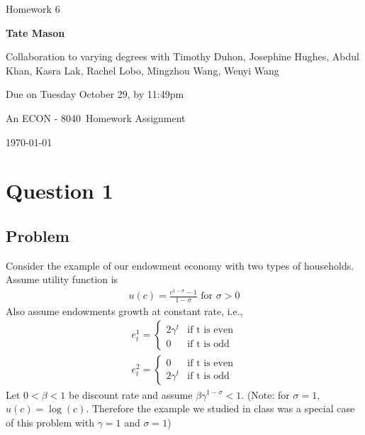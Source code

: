 \documentclass[10pt, a4paper]{article}
\newcommand\course{ECON - 8040}
\newcommand\hwnumber{6}
\newcommand\Information{Tate Mason}
\begin{document}
  \begin{titlepage}
    \begin{center}
      \vspace*{3cm}
            
      \vspace{1cm}
      \huge
      Homework \hwnumber
            
      \vspace{1.5cm}
      \Large
            
      \textbf{\Information}
            
      \vfill
      
      Collaboration to varying degrees with Timothy Duhon, Josephine Hughes, Abdul Khan, Kasra Lak, Rachel Lobo, Mingzhou Wang, Wenyi Wang
      \vspace{1cm}
      
      Due on Tuesday October 29, by 11:49pm

      \vspace{1cm}

      An \course \ Homework Assignment
            
      \vspace{1cm}
      \Large
      
      \today
            
    \end{center}
  \end{titlepage}

\section*{Question 1}
  \subsection*{Problem}
      Consider the example of our endowment economy with two types of households. Assume utility function is
      \begin{gather*}
        u(c) = \frac{c^{1-\sigma}-1}{1-\sigma} \text{ for } \sigma > 0
      \end{gather*}
      Also assume endowments growth at constant rate, i.e.,
      \begin{gather*}
        e^1_t = \begin{cases}
          2\gamma^t & \text{if t is even}\\
          0 & \text{if t is odd}
        \end{cases}\\
        e^2_t = \begin{cases}
          0 & \text{if t is even}\\
          2\gamma^t & \text{if t is odd}
        \end{cases}
      \end{gather*}
      Let $0 < \beta < 1$ be discount rate and assume $\beta\gamma^{1-\sigma} < 1$. (Note: for $\sigma = 1$, $u(c) = \log(c)$. Therefore the example we studied in class was a special case of this problem with $\gamma = 1$ and $\sigma = 1$)
\end{document}
